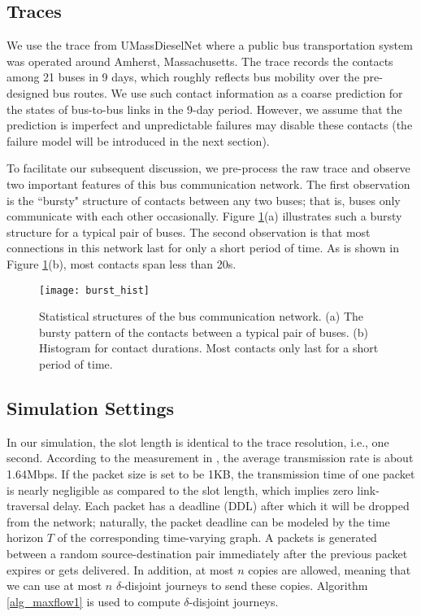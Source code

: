 \documentclass[10pt, conference, letterpaper]{IEEEtran}
\begin{document}
\subsection{Traces}\label{tr_stat}
We use the trace from UMassDieselNet \cite{trace} where a public bus transportation system was operated around Amherst, Massachusetts. The trace records the contacts among 21 buses in 9 days, which roughly reflects bus mobility over the pre-designed bus routes. We use such contact information as a coarse prediction for the states of bus-to-bus links in the 9-day period. However, we assume that the prediction is imperfect and unpredictable failures may disable these contacts (the failure model will be introduced in the next section).

To facilitate our subsequent discussion, we pre-process the raw trace and observe two important features of this bus communication network. The first observation is the ``bursty" structure of contacts between any two buses; that is, buses only communicate with each other occasionally. Figure \ref{trace_stat}(a) illustrates such a bursty structure for a typical pair of buses. The second observation is that most connections in this network last for only a short period of time. As is shown in Figure \ref{trace_stat}(b), most contacts span less than 20s.

\begin{figure}[t]
\begin{center}
\texttt{[image: burst\_hist]}
\caption{Statistical structures of the bus communication network. (a) The bursty pattern of the contacts between a typical pair of buses. (b) Histogram for contact durations. Most contacts only last for a short period of time.}
\label{trace_stat}\vspace{-3mm}
\end{center}
\end{figure}



\subsection{Simulation Settings}
In our simulation, the slot length is identical to the trace resolution, i.e., one second. According to the measurement in \cite{trace}, the average transmission rate is about 1.64Mbps. If the packet size is set to be 1KB, the transmission time of one packet is nearly negligible as compared to the slot length, which implies zero link-traversal delay. Each packet has a deadline (DDL) after which it will be dropped from the network; naturally, the packet deadline can be modeled by the time horizon $T$ of the corresponding time-varying graph.  A packets is generated between a random source-destination pair immediately after the previous packet expires or gets delivered. In addition, at most $n$ copies are allowed, meaning that we can use at most $n$ $\delta$-disjoint journeys to send these copies.  Algorithm \ref{alg_maxflow1} is used to compute $\delta$-disjoint journeys.
\end{document}
